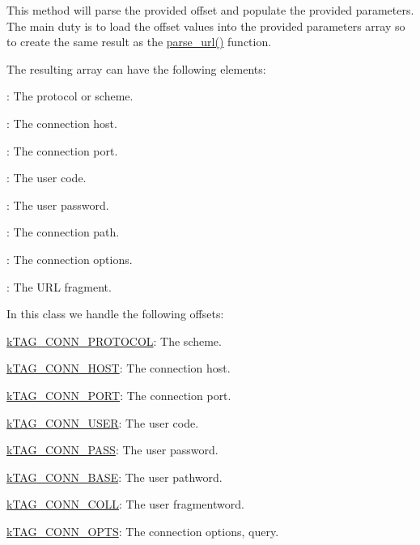 This method will parse the provided offset and populate the provided parameters. The main duty is to load the offset values into the provided parameters array so to create the same result as the \hyperlink{}{parse\-\_\-url()} function.

The resulting array can have the following elements\-:


\begin{DoxyItemize}
\item {}\-: The protocol or scheme. 
\item {}\-: The connection host. 
\item {}\-: The connection port. 
\item {}\-: The user code. 
\item {}\-: The user password. 
\item {}\-: The connection path. 
\item {}\-: The connection options. 
\item {}\-: The U\-R\-L fragment. 
\end{DoxyItemize}

In this class we handle the following offsets\-:


\begin{DoxyItemize}
\item {\ttfamily \hyperlink{}{k\-T\-A\-G\-\_\-\-C\-O\-N\-N\-\_\-\-P\-R\-O\-T\-O\-C\-O\-L}}\-: The {\ttfamily scheme}. 
\item {\ttfamily \hyperlink{}{k\-T\-A\-G\-\_\-\-C\-O\-N\-N\-\_\-\-H\-O\-S\-T}}\-: The connection {\ttfamily host}. 
\item {\ttfamily \hyperlink{}{k\-T\-A\-G\-\_\-\-C\-O\-N\-N\-\_\-\-P\-O\-R\-T}}\-: The connection {\ttfamily port}. 
\item {\ttfamily \hyperlink{}{k\-T\-A\-G\-\_\-\-C\-O\-N\-N\-\_\-\-U\-S\-E\-R}}\-: The {\ttfamily user} code. 
\item {\ttfamily \hyperlink{}{k\-T\-A\-G\-\_\-\-C\-O\-N\-N\-\_\-\-P\-A\-S\-S}}\-: The user {\ttfamily pass}word. 
\item {\ttfamily \hyperlink{}{k\-T\-A\-G\-\_\-\-C\-O\-N\-N\-\_\-\-B\-A\-S\-E}}\-: The user {\ttfamily path}word. 
\item {\ttfamily \hyperlink{}{k\-T\-A\-G\-\_\-\-C\-O\-N\-N\-\_\-\-C\-O\-L\-L}}\-: The user {\ttfamily fragment}word. 
\item {\ttfamily \hyperlink{}{k\-T\-A\-G\-\_\-\-C\-O\-N\-N\-\_\-\-O\-P\-T\-S}}\-: The connection options, {\ttfamily query}. 
\end{DoxyItemize}

